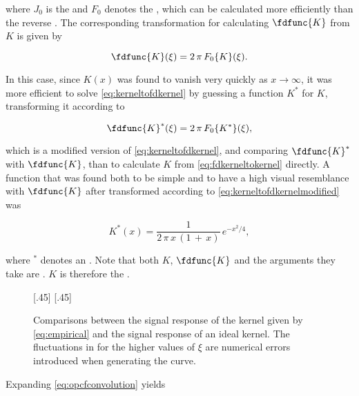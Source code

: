 where $J_0$ is the  and $F_0$ denotes the , which can be calculated more efficiently than the reverse . The corresponding transformation for calculating $\fdfunc{K}$ from $K$ is given by

\begin{equation} \label{eq:kerneltofdkernel}
\fdfunc{K}(\xi) = 2\,\pi\,F_0\{K\}(\xi).
\end{equation}

In this case, since $K(x)$ was found to vanish very quickly as $x\rightarrow\infty$, it was more efficient to solve \eqref{eq:kerneltofdkernel} by guessing a function $K^*$ for $K$, transforming it according to

\begin{equation} \label{eq:kerneltofdkernelmodified}
\fdfunc{K}^*(\xi) = 2\,\pi\,F_0\{K^*\}(\xi),
\end{equation}

which is a modified version of \eqref{eq:kerneltofdkernel}, and comparing $\fdfunc{K}^*$ with $\fdfunc{K}$, than to calculate $K$ from \eqref{eq:fdkerneltokernel} directly. A function that was found both to be simple and to have a high visual resemblance with $\fdfunc{K}$ after transformed according to \eqref{eq:kerneltofdkernelmodified} was

\begin{equation} \label{eq:empirical}
K^*(x) = \frac{1}{2\,\pi\,x\,(1\,+\,x)}\,e^{-x^2/4},
\end{equation}

where $^*$ denotes an \estimate. Note that both $K$, $\fdfunc{K}$ and the arguments they take are . $K$ is therefore the .

\begin{figure}
    \subcaptionbox{\label{fig:tranasformedkernelcomparison}}[.45\textwidth]{}
    \subcaptionbox{\label{fig:tranasformedkernelratio}}[.45\textwidth]{}
    \caption{Comparisons between the signal response of the kernel given by \eqref{eq:empirical} and the signal response of an ideal kernel. The fluctuations in  for the higher values of $\xi$ are numerical errors introduced when generating the curve.}
    \label{fig:transformedestimatedkernel}
\end{figure}

Expanding \eqref{eq:opcfconvolution} yields

